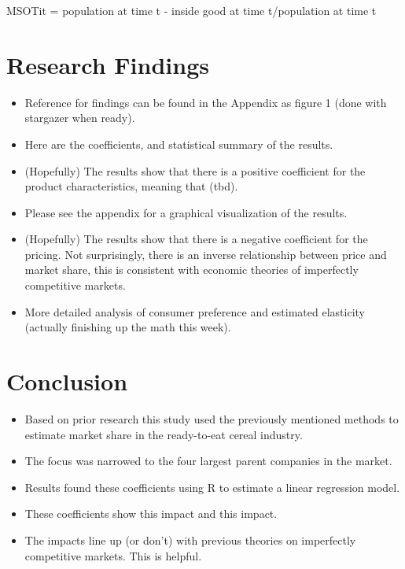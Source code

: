 \documentclass[12pt,english]{article}
\begin{document}
      MSOTit = population at time t - inside good at time t/population at time t

\section{Research Findings}

\begin{itemize}
    \item Reference for findings can be found in the Appendix as figure 1 (done with stargazer when ready).
    \item Here are the coefficients, and statistical summary of the results.
    \item (Hopefully) The results show that there is a positive coefficient for the product characteristics, meaning that (tbd).
    \item Please see the appendix for a graphical visualization of the results.
    \item  (Hopefully) The results show that there is a negative coefficient for the pricing. Not surprisingly, there is an inverse relationship between price and market share, this is consistent with economic theories of imperfectly competitive markets.
    \item More detailed analysis of consumer preference and estimated elasticity (actually finishing up the math this week).
\end{itemize}

\section{Conclusion}

\begin{itemize}
    \item Based on prior research this study used the previously mentioned methods to estimate market share in the ready-to-eat cereal industry. 
    \item The focus was narrowed to the four largest parent companies in the market.
    \item Results found these coefficients using R to estimate a linear regression model.
    \item These coefficients show this impact and this impact.
    \item The impacts line up (or don't) with previous theories on imperfectly competitive markets. This is helpful.
\end{itemize}




\nocite{*}

\end{document}
